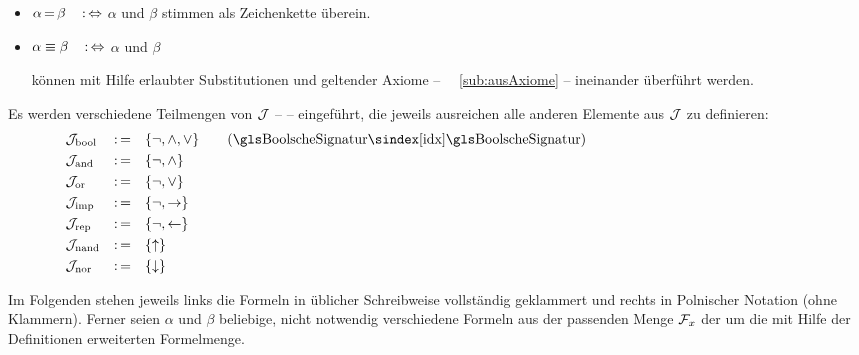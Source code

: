 \begin{itemize}
	\item[] $\alpha \operatorname{=}    \beta \quad \operatorname{:\Leftrightarrow}$ \quad $\alpha$ und $\beta$
	stimmen als Zeichenkette überein.
	\item[] $\alpha \equiv \beta \quad \operatorname{:\Leftrightarrow}$ \quad $\alpha$ und $\beta$
	\parbox[t]{11cm}{können mit Hilfe erlaubter Substitutionen und geltender Axiome -- \seename\ \subsectionname~\vref{sub:ausAxiome} -- ineinander überführt werden.}
\end{itemize}

Es werden verschiedene Teilmengen von $\mathcal{J}$ --  -- eingeführt, die jeweils ausreichen alle anderen Elemente aus $\mathcal{J}$ zu definieren:
\begin{align}
	& \asJ_\xBool & \defeq & \quad\{ \lnot, \land, \lor \} \label{def:Jbool}
	\qquad (\text{\glsIdx{BoolscheSignatur}})                                \\
	& \asJ_\xAnd  & \defeq & \quad\{ \lnot, \land       \} \label{def:Jand}  \\
	& \asJ_\xOr   & \defeq & \quad\{ \lnot, \lor        \} \label{def:Jor}   \\
	& \asJ_\xImp  & \defeq & \quad\{ \lnot, \limp       \} \label{def:Jimp}  \\
	& \asJ_\xRep  & \defeq & \quad\{ \lnot, \lrep       \} \label{def:Jrep}  \\
	& \asJ_\xNand & \defeq & \quad\{ \lnand             \} \label{def:Jnand} \\
	& \asJ_\xNor  & \defeq & \quad\{ \lnor              \} \label{def:Jnor}
	\formulatoleft\formulatoleft\formulatoleft
\end{align}

Im Folgenden stehen jeweils links die Formeln in üblicher Schreibweise vollständig geklammert und rechts in Polnischer Notation (ohne Klammern).
Ferner seien $\alpha$ und $\beta$ beliebige, nicht notwendig verschiedene Formeln aus der passenden Menge $\mathcal{F}_x$ \textbzw der um die mit Hilfe der Definitionen erweiterten Formelmenge.

